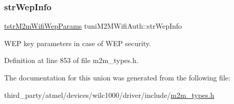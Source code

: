 \mbox{\label{uniontuniM2MWifiAuth_aa2cfdea0ab317d0a2b20274fdedd20b2}} 
\subsubsection{\texorpdfstring{str\+Wep\+Info}{strWepInfo}}
{\footnotesize\ttfamily \hyperlink{structtstrM2mWifiWepParams}{tstr\+M2m\+Wifi\+Wep\+Params} tuni\+M2\+M\+Wifi\+Auth\+::str\+Wep\+Info}

W\+EP key parameters in case of W\+EP security. 

Definition at line 853 of file m2m\+\_\+types.\+h.



The documentation for this union was generated from the following file\+:\begin{DoxyCompactItemize}
\item 
third\+\_\+party/atmel/devices/wilc1000/driver/include/\hyperlink{m2m__types_8h}{m2m\+\_\+types.\+h}\end{DoxyCompactItemize}
